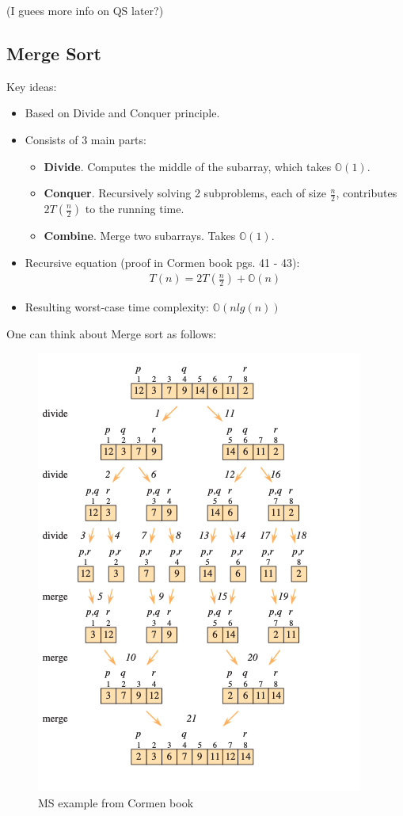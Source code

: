 \documentclass[a4paper,
  twoside, %
  headlines=2.1 %
  ]{scrartcl}
\begin{document}
    (I guees more info on QS later?)


    \clearpage
    \subsection*{Merge Sort}
    
    Key ideas:
    
    \begin{itemize}
        \item Based on Divide and Conquer principle.
        \item Consists of 3 main parts:
        \begin{itemize}
            \item \textbf{Divide}. Computes the middle of the subarray, which takes $\mathbb{O}(1)$.
            \item \textbf{Conquer}. Recursively solving 2 subproblems, each of size $\frac{n}{2}$, contributes $2T(\frac{n}{2})$ to the running time.
            \item \textbf{Combine}. Merge two subarrays. Takes $\mathbb{O}(1)$.
        \end{itemize}
        \item Recursive equation (proof in Cormen book pgs. 41 - 43):
        \begin{align*}
            T(n) = 2T\left(\frac{n}{2}\right) + \mathbb{O}(n)
        \end{align*}
        \item Resulting worst-case time complexity: $\mathbb{O}(nlg(n))$
    \end{itemize}
    
    One can think about Merge sort as follows:
    
    \begin{figure}[H]
        \centering
        \includegraphics[width=0.5\linewidth]{merge_sort_example_cormen.png}
        \caption{MS example from Cormen book}
        \label{fig:enter-label}
    \end{figure}
    
\end{document}
